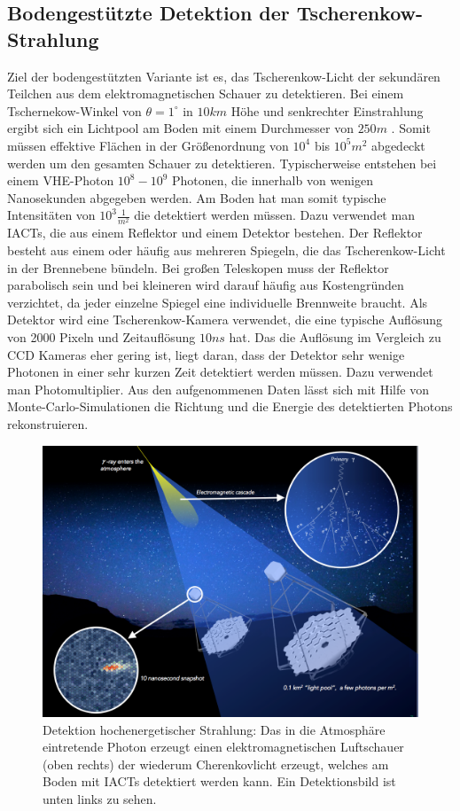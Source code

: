 \subsection{Bodengestützte Detektion der Tscherenkow-Strahlung}
Ziel der bodengestützten Variante ist es, das Tscherenkow-Licht der sekundären Teilchen aus dem elektromagnetischen Schauer zu detektieren. Bei einem Tschernekow-Winkel von $\theta=1^{\circ}$ in $10\unit{km}$ Höhe und senkrechter Einstrahlung ergibt sich ein Lichtpool am Boden mit einem Durchmesser von $250\unit{m}$ \cite{DesignConcept}. Somit müssen effektive Flächen in der Größenordnung von $10^4$ bis $10^5\unit{m^2}$ abgedeckt werden um den gesamten Schauer zu detektieren. Typischerweise entstehen bei einem VHE-Photon $10^8-10^9$ Photonen, die innerhalb von wenigen Nanosekunden abgegeben werden. Am Boden hat man somit typische Intensitäten von $10^3\unit{\frac{1}{m^2}}$ die detektiert werden müssen.
Dazu verwendet man IACTs, die aus einem Reflektor und einem Detektor bestehen. Der Reflektor besteht aus einem oder häufig aus mehreren Spiegeln, die das Tscherenkow-Licht in der Brennebene bündeln. Bei großen Teleskopen muss der Reflektor parabolisch sein und bei kleineren wird darauf häufig aus Kostengründen verzichtet, da jeder einzelne Spiegel eine individuelle Brennweite braucht.
Als Detektor wird eine Tscherenkow-Kamera verwendet, die eine typische Auflösung von 2000 Pixeln und Zeitauflösung $10\unit{ns}$\cite{CherenkovCam} hat. Das die Auflösung im Vergleich zu CCD Kameras eher gering ist, liegt daran, dass der Detektor sehr wenige Photonen in einer sehr kurzen Zeit detektiert werden müssen. Dazu verwendet man Photomultiplier.
Aus den aufgenommenen Daten lässt sich mit Hilfe von Monte-Carlo-Simulationen die Richtung und die Energie des detektierten Photons rekonstruieren. 

\begin{figure}[htbp]
\centering
\includegraphics[width=\textwidth]{Images/detection.png}
\caption{Detektion hochenergetischer Strahlung: Das in die Atmosphäre eintretende Photon erzeugt einen elektromagnetischen Luftschauer (oben rechts) der wiederum Cherenkovlicht erzeugt, welches am Boden mit IACTs detektiert werden kann. Ein Detektionsbild ist unten links zu sehen.}
\label{img:detection}
\end{figure}

